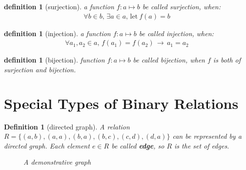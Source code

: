 \newtheorem{injection}[theorem_root]{definition}
\newtheorem{surjection}[theorem_root]{definition}
\newtheorem{bijection}[theorem_root]{definition}
\begin{surjection}[surjection]
a function $f: a\mapsto b$ be called surjection, when:
\begin{align*}
\forall b\in b,\,\exists a\in a,\,\text{let}\ f(a) = b
\end{align*}
\end{surjection}
\begin{injection}[injection]
a function $f: a\mapsto b$ be called injection, when:
\begin{align*}
\forall a_1, a_2\in a,\, f(a_1) = f(a_2) \,\longrightarrow\, a_1 = a_2
\end{align*}
\end{injection}
\begin{bijection}[bijection]
function $f: a\mapsto b$ be called bijection, when $f$ is both of surjection and bijection.
\end{bijection}

\section{Special Types of Binary Relations}

\newtheorem{directedgraph}[theorem_root]{Definition}
\begin{directedgraph}[directed graph]
    A relation $R = \{(a, b), (a, a), (b, a), (b, c), (c, d), (d,a)\}$ can be represented by a directed graph.
    Each element $e\in R$ be called {\bf edge}, so $R$ is the set of edges.
    \begin{figure}[H]
    \begin{center}
    \caption{A demonstrative graph}
    \label{fig:demo-graph}
    \end{center}
    \end{figure}
\end{directedgraph}

